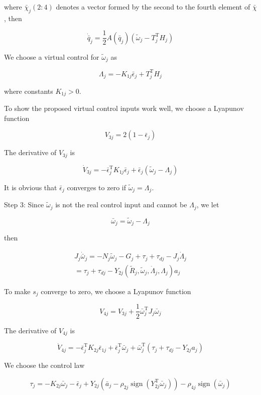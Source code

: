 \documentclass[10pt]{article}
\begin{document}
where $\bar{\chi}_{j}(2: 4)$ denotes a vector formed by the second to the fourth element of $\bar{\chi}$, then

$$
\dot{\bar{q}}_{j}=\frac{1}{2} A\left(\bar{q}_{j}\right)\left(\tilde{\omega}_{j}-T_{j}^{\mathrm{T}} H_{j}\right)
$$

We choose a virtual control for $\tilde{\omega}_{j}$ as

$$
\Lambda_{j}=-K_{1 j} \bar{\epsilon}_{j}+T_{j}^{\mathrm{T}} H_{j}
$$

where constants $K_{1 j}>0$.

To show the proposed virtual control inputs work well, we choose a Lyapunov function

$$
V_{3 j}=2\left(1-\bar{\epsilon}_{j}\right)
$$

The derivative of $V_{3 j}$ is

$$
\dot{V}_{3 j}=-\bar{\epsilon}_{j}^{\mathrm{T}} K_{1 j} \bar{\epsilon}_{j}+\bar{\epsilon}_{j}\left(\tilde{\omega}_{j}-\Lambda_{j}\right)
$$

It is obvious that $\bar{\epsilon}_{j}$ converges to zero if $\tilde{\omega}_{j}=\Lambda_{j}$.

Step 3: Since $\tilde{\omega}_{j}$ is not the real control input and cannot be $\Lambda_{j}$, we let

$$
\bar{\omega}_{j}=\tilde{\omega}_{j}-\Lambda_{j}
$$

then

$$
\begin{gathered}
J_{j} \dot{\bar{\omega}}_{j}=-N_{j} \tilde{\omega}_{j}-G_{j}+\tau_{j}+\tau_{d j}-J_{j} \dot{\Lambda}_{j} \\
=\tau_{j}+\tau_{d j}-Y_{2 j}\left(\tilde{R}_{j}, \tilde{\omega}_{j}, \dot{\Lambda}_{j}, \Lambda_{j}\right) a_{j}
\end{gathered}
$$

To make $s_{j}$ converge to zero, we choose a Lyapunov function

$$
V_{4 j}=V_{3 j}+\frac{1}{2} \bar{\omega}_{j}^{\mathrm{T}} J_{j} \bar{\omega}_{j}
$$

The derivative of $V_{4 j}$ is

$$
\dot{V}_{4 j}=-\bar{\epsilon}_{j}^{\mathrm{T}} K_{2 j} \bar{\epsilon}_{1 j}+\bar{\epsilon}_{j}^{\mathrm{T}} \bar{\omega}_{j}+\bar{\omega}_{j}^{\mathrm{T}}\left(\tau_{j}+\tau_{d j}-Y_{2 j} a_{j}\right)
$$

We choose the control law

$$
\tau_{j}=-K_{2 j} \bar{\omega}_{j}-\bar{\epsilon}_{j}+Y_{2 j}\left(\bar{a}_{j}-\rho_{2 j} \operatorname{sign}\left(Y_{2 j}^{\mathrm{T}} \bar{\omega}_{j}\right)\right)-\rho_{4 j} \operatorname{sign}\left(\bar{\omega}_{j}\right)
$$
\end{document}
